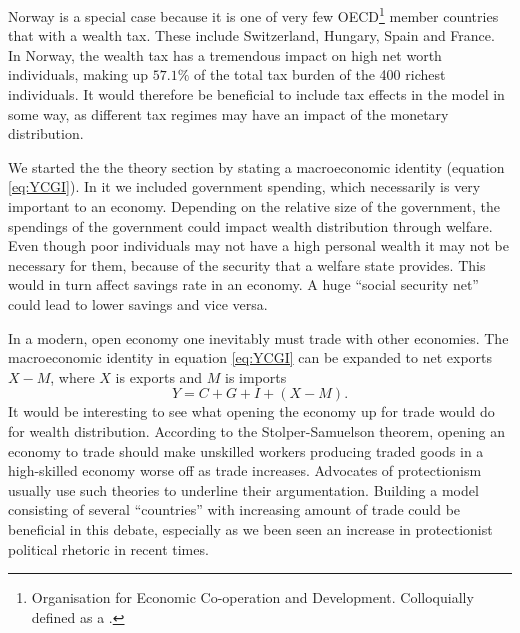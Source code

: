 \documentclass[10pt, a4paper]{amsart}
\begin{document}
Norway is a special case because it is one of very few OECD\footnote{Organisation for Economic Co-operation and Development. Colloquially defined as a .} member countries that with a wealth tax. These include Switzerland, Hungary, Spain and France\cite{OECD}. In Norway, the wealth tax has a tremendous impact on high net worth individuals, making up $57.1\%$ of the total tax burden of the 400 richest individuals\cite{NHHmaster}. It would therefore be beneficial to include tax effects in the model in some way, as different tax regimes may have an impact of the monetary distribution.

We started the the theory section by stating a macroeconomic identity (equation \ref{eq:YCGI}). In it we included government spending, which necessarily is very important to an economy. Depending on the relative size of the government, the spendings of the government could impact wealth distribution through welfare. Even though poor individuals may not have a high personal wealth it may not be necessary for them, because of the security that a welfare state provides. This would in turn affect savings rate in an economy. A huge ``social security net'' could lead to lower savings and vice versa.

In a modern, open economy one inevitably must trade with other economies. The macroeconomic identity in equation \ref{eq:YCGI} can be expanded to net exports $X-M$, where $X$ is exports and $M$ is imports
\begin{equation}
Y = C + G + I + (X-M).
\end{equation}
It would be interesting to see what opening the economy up for trade would do for wealth distribution. According to the Stolper-Samuelson theorem, opening an economy to trade should make unskilled workers producing traded goods in a high-skilled economy worse off as trade increases\cite{StolperSamuelson}. Advocates of protectionism usually use such theories to underline their argumentation. Building a model consisting of several ``countries'' with increasing amount of trade could be beneficial in this debate, especially as we been seen an increase in protectionist political rhetoric in recent times.
		
\end{document}
